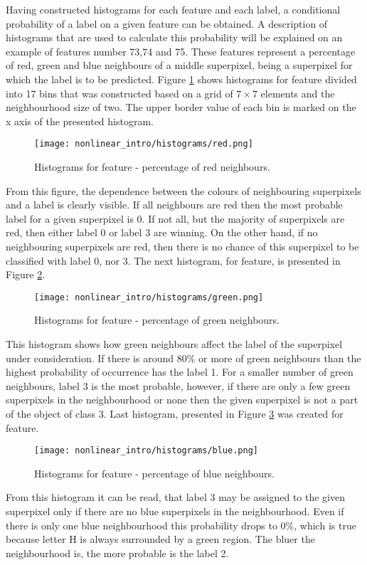 Having constructed histograms for each feature and each label, a conditional probability of a label on a given feature can be obtained. A description of histograms that are used to calculate this probability will be explained on an example of features number 73,74 and 75. These features represent a percentage of red, green and blue neighbours of a middle superpixel, being a superpixel for which the label is to be predicted. Figure \ref{fig:nonlinear_histogram_red} shows histograms for  feature divided into 17 bins that was constructed based on a grid of $7 \times 7$ elements and the neighbourhood size of two. The upper border value of each bin is marked on the x axis of the presented histogram. 
\begin{figure}[!htb]
    \centering
    \texttt{[image: nonlinear\_intro/histograms/red.png]}
    \caption{Histograms for  feature - percentage of red neighbours.}
    \label{fig:nonlinear_histogram_red}
\end{figure}
From this figure, the dependence between the colours of neighbouring superpixels and a label is clearly visible. If all neighbours are red then the most probable label for a given superpixel is 0. If not all, but the majority of superpixels are red, then either label 0 or label 3 are winning. On the other hand, if no neighbouring superpixels are red, then there is no chance of this superpixel to be classified with label 0, nor 3. The next histogram, for  feature, is presented in Figure \ref{fig:nonlinear_histogram_green}.
\begin{figure}[!htb]
    \centering
    \texttt{[image: nonlinear\_intro/histograms/green.png]}
    \caption{Histograms for  feature - percentage of green neighbours.}
    \label{fig:nonlinear_histogram_green}
\end{figure}
This histogram shows how green neighbours affect the label of the superpixel under consideration. If there is around 80\% or more of green neighbours than the highest probability of occurrence has the label 1. For a smaller number of green neighbours, label 3 is the most probable, however, if there are only a few green superpixels in the neighbourhood or none then the given superpixel is not a part of the object of class 3. Last histogram, presented in Figure \ref{fig:nonlinear_histogram_blue} was created for  feature.
\begin{figure}[!htb]
    \centering
    \texttt{[image: nonlinear\_intro/histograms/blue.png]}
    \caption{Histograms for  feature - percentage of blue neighbours.}
    \label{fig:nonlinear_histogram_blue}
\end{figure}
From this histogram it can be read, that label 3 may be assigned to the given superpixel only if there are no blue superpixels in the neighbourhood. Even if there is only one blue neighbourhood this probability drops to 0\%, which is true because letter H is always surrounded by a green region. The bluer the neighbourhood is, the more probable is the label 2.

